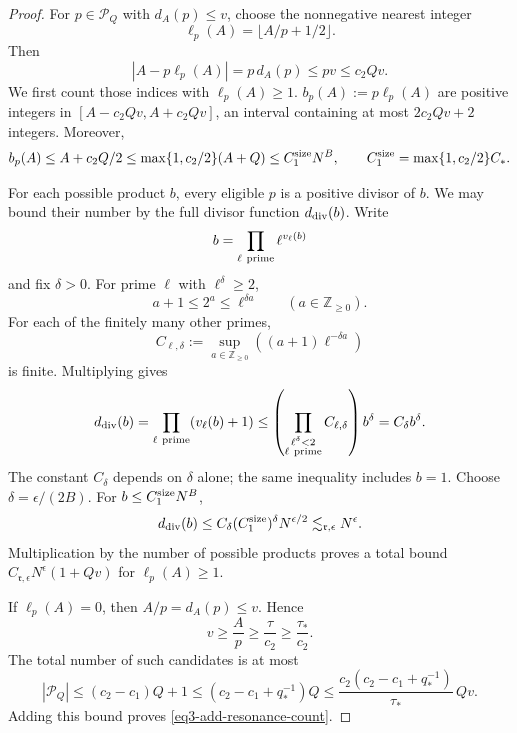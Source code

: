 \documentclass[reqno,12pt]{amsart}
\def \Z {\mathbb Z}
\numberwithin{equation}{section}
\begin{document}
\begin{proof}
For $p\in\mathcal P_Q$ with $d_A(p)\le v$, choose the nonnegative
nearest integer
\[
 \ell_p(A)=\lfloor A/p+1/2\rfloor.
\]
Then
\[
 |A-p\ell_p(A)|=p\,d_A(p)\le pv\le c_2Qv.
\]
We first count those indices with $\ell_p(A)\ge1$.
$b_p(A):=p\ell_p(A)$ are positive integers in
$[A-c_2Qv,A+c_2Qv]$, an interval containing at most $2c_2Qv+2$
integers. Moreover,
\[
 b_p(A)\le A+c_2Q/2
 \le\max\{1,c_2/2\}(A+Q)
 \le C_1^{\rm size}N^B,
 \qquad C_1^{\rm size}=\max\{1,c_2/2\}C_*.
\]

For each possible product $b$, every eligible $p$ is a positive
divisor of $b$. We may bound their number by the full divisor
function $d_{\rm div}(b)$.
Write $$b=\prod_{\ell\ \textup{prime}}\ell^{v_\ell(b)}$$ and fix $\delta>0$. For prime $\ell$ with $\ell^\delta\ge2$,
\[
 a+1\le2^a\le\ell^{\delta a}\qquad(a\in\Z_{\ge0}).
\]
For each of the finitely many other primes,
$$C_{\ell,\delta}:=\sup_{a\in\Z_{\ge0}}((a+1)\ell^{-\delta a})$$
is finite. Multiplying gives
\[
 d_{\rm div}(b)=\prod_{\ell\ \textup{prime}}(v_\ell(b)+1)
 \le\left(\prod_{\substack{\ell^\delta<2\\ \ell\ \textup{prime}}}C_{\ell,\delta}\right)b^\delta
 =C_\delta b^\delta.
\]
The constant $C_\delta$ depends on $\delta$ alone; the same inequality
includes $b=1$. Choose $\delta=\epsilon/(2B)$. For
$b\le C_1^{\rm size}N^B$,
\[
 d_{\rm div}(b)\le C_\delta(C_1^{\rm size})^\delta N^{\epsilon/2}
                  \lesssim_{\mathfrak r,\epsilon}N^\epsilon.
\]
Multiplication by the number of possible products proves a total
bound $C_{\mathfrak r,\epsilon}N^\epsilon(1+Qv)$ for
$\ell_p(A)\ge1$.

If $\ell_p(A)=0$, then $A/p=d_A(p)\le v$. Hence
\[
 v\ge\frac A p\ge\frac\tau{c_2}\ge\frac{\tau_*}{c_2}.
\]
The total number of such candidates is at most
\[
 |\mathcal P_Q|\le(c_2-c_1)Q+1
 \le(c_2-c_1+q_*^{-1})Q
 \le\frac{c_2(c_2-c_1+q_*^{-1})}{\tau_*}\,Qv.
\]
Adding this bound proves \eqref{eq3-add-resonance-count}.


\end{proof}
\end{document}
